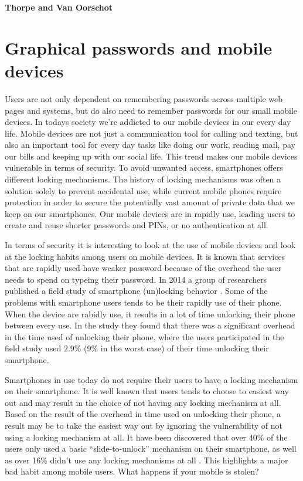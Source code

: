  {\bf \color{red} Thorpe and Van Oorschot}
  

\section{Graphical passwords and mobile devices}
  Users are not only dependent on remembering passwords across multiple web pages and systems, but do also need to remember passwords for our small mobile devices. In todays society we're addicted to our mobile devices in our every day life. Mobile devices are not just a communication tool for calling and texting, but also an important tool for every day tasks like doing our work, reading mail, pay our bills and keeping up with our social life. This trend makes our mobile devices vulnerable in terms of security. To avoid unwanted access, smartphones offers different locking mechanisms. The history of locking mechanisms was often a solution solely to prevent accidental use, while current mobile phones require protection in order to secure the potentially vast amount of private data that we keep on our smartphones. Our mobile devices are in rapidly use, leading users to create and reuse shorter passwords and PINs, or no authentication at all. 

  In terms of security it is interesting to look at the use of mobile devices and look at the locking habits among users on mobile devices. It is known that services that are rapidly used have weaker password because of the overhead the user needs to spend on typeing their password. In 2014 a group of researchers published a field study of smartphone (un)locking behavior \cite{habits3}. Some of the problems with smartphone users tends to be their rapidly use of their phone. When the device are rabidly use, it results in a lot of time unlocking their phone between every use. In the study they found that there was a significant overhead in the time used of unlocking their phone, where the users participated in the field study used 2.9\% (9\% in the worst case) of their time unlocking their smartphone. 
  
  Smartphones in use today do not require their users to have a locking mechanism on their smartphone. It is well known that users tends to choose to easiest way out and may result in the choice of not having any locking mechanism at all. Based on the result of the overhead in time used on unlocking their phone, a result may be to take the easiest way out by ignoring the vulnerability of not using a locking mechanism at all. It have been discovered that over 40\% of the users only used a basic ``slide-to-unlock'' mechanism on their smartphone, as well as over 16\% didn't use any locking mechanisms at all \cite{habits3}. This highlights a major bad habit among mobile users. What happens if your mobile is stolen? 

